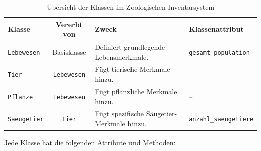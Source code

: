 \clearpage

\begin{table}[h]
    \centering
    \caption{Übersicht der Klassen im Zoologischen Inventarsystem}
    \label{tab:klassen_uebersicht}
    \begin{tabular}{l c l l}
        \toprule
        \textbf{Klasse} & \textbf{Vererbt von} & \textbf{Zweck} & \textbf{Klassenattribut} \\
        \midrule
        \texttt{Lebewesen} & Basisklasse & Definiert grundlegende Lebensmerkmale. & \texttt{gesamt\_population} \\
        \texttt{Tier} & \texttt{Lebewesen} & Fügt tierische Merkmale hinzu. & -- \\
        \texttt{Pflanze} & \texttt{Lebewesen} & Fügt pflanzliche Merkmale hinzu. & -- \\
        \texttt{Saeugetier} & \texttt{Tier} & Fügt spezifische Säugetier-Merkmale hinzu. & \texttt{anzahl\_saeugetiere} \\
        \bottomrule
    \end{tabular}
\end{table}

Jede Klasse hat die folgenden Attribute und Methoden:

